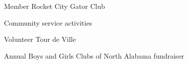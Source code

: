 
\begin{cventries}
  \cventry
    {Member} {Rocket City Gator Club} {} {} {
      \begin{cvitems}
      \item {Community service activities}
      \end{cvitems}
    }

  \cventry
    {Volunteer} {Tour de Ville} {} {} {
      \begin{cvitems}
      \item {Annual Boys and Girls Clubs of North Alabama fundraiser}
      \end{cvitems}
    }

\end{cventries}
